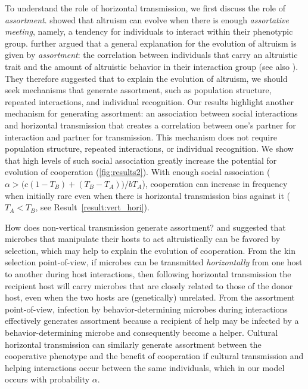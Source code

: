\documentclass[12pt]{extarticle}
\begin{document}
{To understand the role of horizontal transmission, we first discuss the role of \emph{assortment}.
\citet{Eshel1982} showed that altruism can evolve when there is enough \emph{assortative meeting}, namely, a tendency for individuals to interact within their phenotypic group.
\citet{Fletcher2009assortment}  further argued that a general explanation for the evolution of altruism is given by \emph{assortment}: the correlation between individuals that carry an altruistic trait and the amount of altruistic behavior in their interaction group (see also \citet{Bijma2010assortment}).
They therefore suggested that to explain the evolution of altruism, we should seek mechanisms that generate  assortment, such as population structure, repeated interactions, and individual recognition.
Our results highlight another mechanism for generating assortment: an association between social interactions and horizontal transmission that creates a correlation between one's partner for interaction and partner for transmission.
This mechanism does not require population structure, repeated interactions, or individual recognition.
We show that high levels of such social association greatly increase the potential for evolution of cooperation (\autoref{fig:results2}).
With enough social association ($\alpha > \big(c(1-T_B) + (T_B-T_A)\big) / b T_A$), cooperation can increase in frequency when initially rare even when there is horizontal transmission bias against it ($T_A<T_B$, see Result~\autoref{result:vert_hori}).

How does non-vertical transmission generate assortment? 
\citet{lewin2017microbes} and \citet{lewin2020rockpaperscissors} 
suggested that microbes that manipulate their hosts to act altruistically can be favored by selection, which may help to explain the evolution of cooperation. 
From the kin selection point-of-view, if microbes can be transmitted \emph{horizontally} from one host to another during host interactions, then following horizontal transmission the recipient host will carry microbes that are closely related to those of the donor host, 
even when the two hosts are (genetically) unrelated. 
From the assortment point-of-view,
infection by behavior-determining microbes during interactions effectively generates assortment because a recipient of help may be infected by a behavior-determining microbe and consequently become a helper.
Cultural horizontal transmission can similarly generate assortment between the cooperative phenotype and the benefit of cooperation if cultural transmission and helping interactions occur between the same individuals, which in our model occurs with probability $\alpha$. 

}
\end{document}
